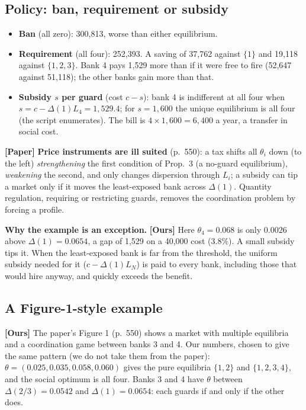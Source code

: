 \documentclass[11pt,a4paper]{article}
\newcommand{\paper}{\textbf{[Paper]}}
\newcommand{\ours}{\textbf{[Ours]}}
\newcommand{\Dl}{\Delta}
\begin{document}
\subsection{Policy: ban, requirement or subsidy}
\begin{itemize}
  \item \textbf{Ban} (all zero): 300,813, worse than either equilibrium.
  \item \textbf{Requirement} (all four): 252,393. A saving of 37,762 against $\{1\}$ and 19,118 against $\{1,2,3\}$. Bank 4 pays 1,529 more than if it were free to fire
        (52,647 against 51,118); the other banks gain more than that.
  \item \textbf{Subsidy $s$ per guard} (cost $c-s$): bank 4 is indifferent at all four when $s=c-\Dl(1)L_4=1{,}529.4$; for
        $s=1{,}600$ the unique equilibrium is all four (the script enumerates). The bill is $4\times1{,}600=6{,}400$ a year, a transfer in
        social cost.
\end{itemize}
\paper{} \textbf{Price instruments are ill suited} (p.\ 550): a tax shifts all $\theta_i$ down (to the left) \emph{strengthening} the first condition
of Prop.\ 3 (a no-guard equilibrium), \emph{weakening} the second, and only changes dispersion through $L_i$; a subsidy
can tip a market only if it moves the least-exposed bank across $\Dl(1)$. Quantity regulation, requiring or restricting guards,
removes the coordination problem by forcing a profile.

\textbf{Why the example is an exception.} \ours{} Here $\theta_4=0.068$ is only $0.0026$ above $\Dl(1)=0.0654$, a gap of 1,529 on a 40,000
cost (3.8\%). A small subsidy tips it. When the least-exposed bank is far from the threshold, the uniform subsidy needed
for it ($c-\Dl(1)L_N$) is paid to every bank, including those that would hire anyway, and quickly exceeds the benefit.

\subsection{A Figure-1-style example}
\ours{} The paper's Figure 1 (p.\ 550) shows a market with multiple equilibria and a coordination game between banks 3 and 4. Our numbers,
chosen to give the same pattern (we do not take them from the paper): $\theta=(0.025,0.035,0.058,0.060)$ gives the pure equilibria $\{1,2\}$ and $\{1,2,3,4\}$, and the
social optimum is all four. Banks 3 and 4 have $\theta$ between $\Dl(2/3)=0.0542$ and $\Dl(1)=0.0654$: each guards if and only if the other does.
\end{document}
